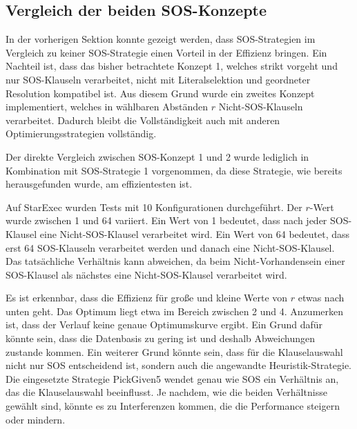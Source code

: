 	\subsection{Vergleich der beiden SOS-Konzepte}
	In der vorherigen Sektion konnte gezeigt werden, dass SOS-Strategien im Vergleich zu keiner SOS-Strategie einen Vorteil in der Effizienz bringen. Ein Nachteil ist, dass das bisher betrachtete Konzept 1, welches strikt vorgeht und nur SOS-Klauseln verarbeitet, nicht mit Literalselektion und geordneter Resolution kompatibel ist. Aus diesem Grund wurde ein zweites Konzept implementiert, welches in wählbaren Abständen $r$ Nicht-SOS-Klauseln verarbeitet. Dadurch bleibt die Vollständigkeit auch mit anderen Optimierungsstrategien vollständig.
	
	Der direkte Vergleich zwischen SOS-Konzept 1 und 2 wurde lediglich in Kombination mit SOS-Strategie 1 vorgenommen, da diese Strategie, wie bereits herausgefunden wurde, am effizientesten ist.
	
	Auf StarExec wurden Tests mit 10 Konfigurationen durchgeführt. Der $r$-Wert wurde zwischen 1 und 64 variiert. Ein Wert von 1 bedeutet, dass nach jeder SOS-Klausel eine Nicht-SOS-Klausel verarbeitet wird. Ein Wert von 64 bedeutet, dass erst 64 SOS-Klauseln verarbeitet werden und danach eine Nicht-SOS-Klausel. Das tatsächliche Verhältnis kann abweichen, da beim Nicht-Vorhandensein einer SOS-Klausel als nächstes eine Nicht-SOS-Klausel verarbeitet wird.
	
	Es ist erkennbar, dass die Effizienz für große und kleine Werte von $r$ etwas nach unten geht. Das Optimum liegt etwa im Bereich zwischen 2 und 4. Anzumerken ist, dass der Verlauf keine genaue Optimumskurve ergibt. Ein Grund dafür könnte sein, dass die Datenbasis zu gering ist und deshalb Abweichungen zustande kommen. Ein weiterer Grund könnte sein, dass für die Klauselauswahl nicht nur SOS entscheidend ist, sondern auch die angewandte Heuristik-Strategie. Die eingesetzte Strategie PickGiven5 wendet genau wie SOS ein Verhältnis an, das die Klauselauswahl beeinflusst. Je nachdem, wie die beiden Verhältnisse gewählt sind, könnte es zu Interferenzen kommen, die die Performance steigern oder mindern.
	
